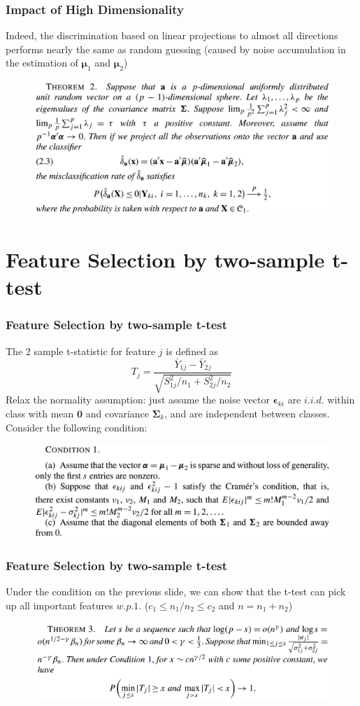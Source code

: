 \documentclass{beamer}
\begin{document}
	\begin{frame}
		\frametitle{Impact of High Dimensionality}
		Indeed, the discrimination based on linear projections to almost all directions performs nearly the same as random guessing (caused by noise accumulation in the estimation of $\bm{\mu}_1$ and $\bm{\mu}_2$)
		\begin{figure}
			\includegraphics[width=0.9\linewidth]{image004.png}
		\end{figure}
	\end{frame}
	
	\section{Feature Selection by two-sample t-test}
	\begin{frame}
		\frametitle{Feature Selection by two-sample t-test}
		The 2 sample t-statistic for feature $j$ is defined as
		$$T_j = \frac{\bar{Y}_{1j} - \bar{Y}_{2j}}{\sqrt{S^2_{1j}/n_1 + S^2_{2j}/n_2}}$$  
		Relax the normality assumption: just assume the noise vector $\bm{\epsilon}_{ki}$ are $i.i.d.$ within class with mean $\bm{0}$ and covariance $\bm{\Sigma}_k$, and are independent between classes. Consider the following condition:
		\begin{figure}
			\includegraphics[width=0.9\linewidth]{image005.png}
		\end{figure}
	\end{frame}
	
	
	\begin{frame}
		\frametitle{Feature Selection by two-sample t-test}
		Under the condition on the previous slide, we  can show that the t-test can pick up all important features $w.p.1.$ ($c_1\leq n_1/n_2\leq c_2$ and $n = n_1 + n_2$)
		\begin{figure}
			\includegraphics[width=1\linewidth]{image006.png}
		\end{figure}
	\end{frame}
	
\end{document}
